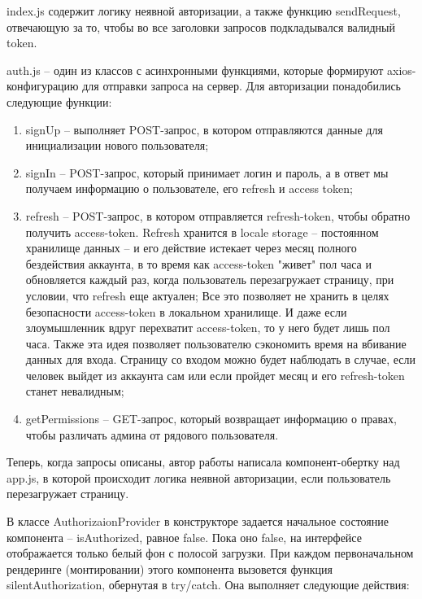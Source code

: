 \documentclass[12pt, a4paper]{diplom}
\begin{document}
index.js содержит логику неявной авторизации, а также функцию sendRequest, отвечающую за то, чтобы во все заголовки запросов подкладывался валидный token.

auth.js -- один из классов с асинхронными функциями, которые формируют axios-конфигурацию для отправки запроса на сервер.
Для авторизации понадобились следующие функции:

\begin{enumerate}
\item signUp -- выполняет POST-запрос, в котором отправляются данные для инициализации нового пользователя;
\item signIn -- POST-запрос, который принимает логин и пароль, а в ответ мы получаем информацию о пользователе, его refresh и access token;
\item refresh -- POST-запрос, в котором отправляется refresh-token, чтобы обратно получить access-token. Refresh хранится в locale storage -- постоянном хранилище данных --
и его действие истекает через месяц полного бездействия аккаунта, в то время как access-token "живет" пол часа и обновляется каждый раз, когда пользователь перезагружает страницу, при условии, что refresh еще актуален;
Все это позволяет не хранить в целях безопасности access-token в локальном хранилище. И даже если злоумышленник вдруг перехватит access-token, то у него будет лишь пол часа. Также эта идея позволяет пользователю сэкономить время на вбивание данных для входа. Страницу со входом можно будет наблюдать в случае, если человек выйдет из аккаунта сам или если пройдет месяц и его refresh-token станет невалидным;
\item getPermissions -- GET-запрос, который возвращает информацию о правах, чтобы различать админа от рядового пользователя.
\end{enumerate}

Теперь, когда запросы описаны, автор работы написала компонент-обертку над app.js, в которой происходит логика неявной авторизации, если пользователь перезагружает страницу.

В классе AuthorizaionProvider в конструкторе задается начальное состояние компонента -- isAuthorized, равное false. Пока оно false, на интерфейсе отображается только белый фон с полосой загрузки. При каждом первоначальном рендеринге (монтировании) этого компонента
вызовется функция silentAuthorization, обернутая в try/catch. Она выполняет следующие действия:
\end{document}

